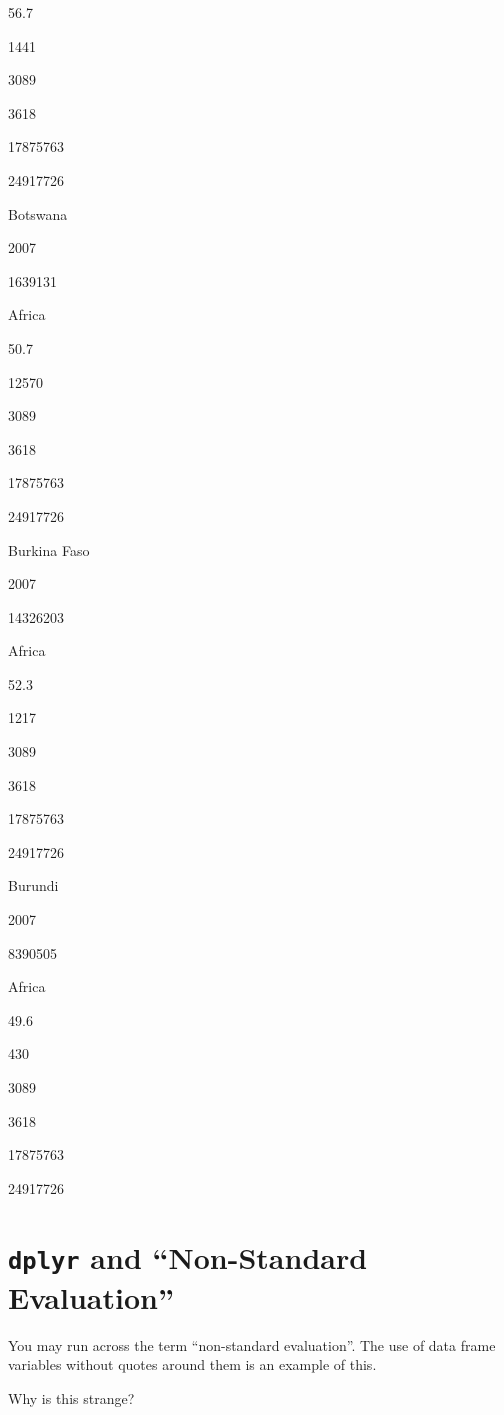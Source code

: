 \documentclass[]{book}
\newenvironment{Shaded}{\begin{snugshade}}{\end{snugshade}}
\newcommand{\KeywordTok}[1]{\textcolor[rgb]{0.13,0.29,0.53}{\textbf{#1}}}
\newcommand{\NormalTok}[1]{#1}
\newcommand{\OperatorTok}[1]{\textcolor[rgb]{0.81,0.36,0.00}{\textbf{#1}}}
\newcommand{\StringTok}[1]{\textcolor[rgb]{0.31,0.60,0.02}{#1}}
\begin{document}
56.7

1441

3089

3618

17875763

24917726

Botswana

2007

1639131

Africa

50.7

12570

3089

3618

17875763

24917726

Burkina Faso

2007

14326203

Africa

52.3

1217

3089

3618

17875763

24917726

Burundi

2007

8390505

Africa

49.6

430

3089

3618

17875763

24917726

\hypertarget{dplyr-and-non-standard-evaluation}{%
\section{\texorpdfstring{\texttt{dplyr} and ``Non-Standard Evaluation''}{dplyr and ``Non-Standard Evaluation''}}\label{dplyr-and-non-standard-evaluation}}

You may run across the term ``non-standard evaluation''. The use of data frame variables without quotes around them is an example of this.

Why is this strange?

\begin{Shaded}
\end{Shaded}
\end{document}
